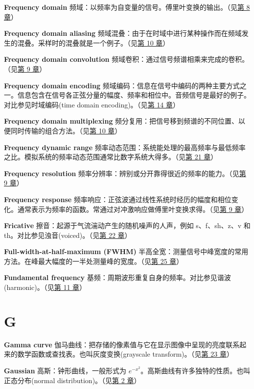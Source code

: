 \textbf{Frequency domain}
频域：以频率为自变量的信号。傅里叶变换的输出。（见\hyperref[ch-08]{第 8
章}）

\textbf{Frequency domain aliasing}
频域混叠：由于在时域中进行某种操作而在频域发生的混叠。采样时的混叠就是一个例子。（见\hyperref[ch-10]{第
10 章}）

\textbf{Frequency domain convolution}
频域卷积：通过信号频谱相乘来完成的卷积。（见\hyperref[ch-09]{第 9 章}）

\textbf{Frequency domain encoding}
频域编码：信息在信号中编码的两种主要方式之一。信息包含在信号各正弦分量的幅度、频率和相位中。音频信号是最好的例子。对比参见时域编码(time
domain encoding)。（见\hyperref[ch-14]{第 14 章}）

\textbf{Frequency domain multiplexing}
频分复用：把信号移到频谱的不同位置、以便同时传输的组合方法。（见\hyperref[ch-10]{第
10 章}）

\textbf{Frequency dynamic range}
频率动态范围：系统能处理的最高频率与最低频率之比。模拟系统的频率动态范围通常比数字系统大得多。（见\hyperref[ch-21]{第
21 章}）

\textbf{Frequency resolution}
频率分辨率：辨别或分开靠得很近的频率的能力。（见\hyperref[ch-09]{第 9
章}）

\textbf{Frequency response}
频率响应：正弦波通过线性系统时经历的幅度和相位变化。通常表示为频率的函数。常通过对冲激响应做傅里叶变换求得。（见\hyperref[ch-09]{第
9 章}）

\textbf{Fricative} 擦音：起源于气流湍动产生的随机噪声的人声，例如
s、f、sh、z、v 和 th。对比参见浊音(voiced)。（见\hyperref[ch-22]{第 22
章}）

\textbf{Full-width-at-half-maximum (FWHM)}
半高全宽：测量信号中峰宽度的常用方法。在峰最大幅度的一半处测量峰的宽度。（见\hyperref[ch-25]{第
25 章}）

\textbf{Fundamental frequency}
基频：周期波形重复自身的频率。对比参见谐波(harmonic)。（见\hyperref[ch-11]{第
11 章}）

\section{G}

\textbf{Gamma curve}
伽马曲线：把存储的像素值与它在显示图像中呈现的亮度联系起来的数学函数或查找表。也叫灰度变换(grayscale
transform)。（见\hyperref[ch-23]{第 23 章}）

\textbf{Gaussian} 高斯：钟形曲线，一般形式为
\(e^{-x^2}\)。高斯曲线有许多独特的性质。也叫正态分布(normal
distribution)。（见\hyperref[ch-02]{第 2 章}）

